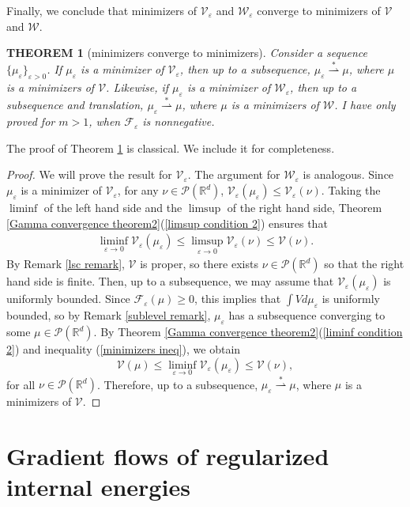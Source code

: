 \documentclass[11pt,leqno]{amsart}
\newtheorem{thm}{THEOREM}[section]
\theoremstyle{definition}
\newcommand{\Rd}{{\mathord{\mathbb R}^d}}
\newcommand{\wsto}{\stackrel{*}{\rightharpoonup}}
\newcommand{\F}{\mathcal{F}}
\def\P{{\mathcal P}}
\def\e{\varepsilon}
\def\F{\mathcal{F}}
\begin{document}
Finally, we conclude that minimizers of $\mathcal{V}_\e$ and $\mathcal{W}_\e$ converge to minimizers of $\mathcal{V}$ and $\mathcal{W}$.

\begin{thm}[minimizers converge to minimizers] \label{minimizers converge theorem}
Consider a sequence $\{ \mu_\e\}_{\e >0}$. If $ \mu_\e$ is a minimizer of $\mathcal{V}_\e$, then up to a subsequence, $\mu_\e \wsto \mu$, where $\mu$ is a minimizers of $\mathcal{V}$. Likewise, if $\mu_\e$ is a minimizer of $\mathcal{W}_\e$, then up to a subsequence and translation, $\mu_\e \wsto \mu$, where $\mu$ is a minimizers of $\mathcal{W}$. {\color{Aquamarine}  {I have only proved for $m>1$, when $\F_\e$ is nonnegative.}}
\end{thm}
 
 The proof of Theorem \ref{minimizers converge theorem} is classical. We include it for completeness.

\begin{proof}
We will prove the result for $\mathcal{V}_\e$. The argument for $\mathcal{W}_\e$ is analogous. Since $\mu_\e$ is a minimizer of $\mathcal{V}_\e$, for any $\nu \in \P(\Rd)$, $\mathcal{V}_\e(\mu_\e) \leq \mathcal{V}_\e(\nu)$. Taking the $\liminf$ of the left hand side and the $\limsup$ of the right hand side, Theorem \ref{Gamma convergence theorem2}(\ref{limsup condition 2}) ensures that 
\begin{align} \label{minimizers ineq}
 \liminf_{\e \to 0} \mathcal{V}_\e(\mu_\e) \leq \limsup_{\e \to 0} \mathcal{V}_\e(\nu) \leq \mathcal{V}(\nu) . 
 \end{align}
By Remark \ref{lsc remark}, $\mathcal{V}$ is proper, so there exists $\nu \in \P(\Rd)$ so that the right hand side is finite. Then, up to a subsequence, we may assume that $ \mathcal{V}_\e(\mu_\e)$ is uniformly bounded. Since $\F_\e(\mu) \geq 0$, this implies that $\int V d \mu_\e$ is uniformly bounded, so by Remark \ref{sublevel remark}, $\mu_\e$ has a subsequence converging to some $\mu \in \P(\Rd)$. By Theorem \ref{Gamma convergence theorem2}(\ref{liminf condition 2}) and inequality (\ref{minimizers ineq}), we obtain
\[ \mathcal{V}(\mu) \leq  \liminf_{\e \to 0} \mathcal{V}_\e(\mu_\e) \leq \mathcal{V}(\nu) ,
\]
for all $\nu \in \P(\Rd)$. Therefore, up to a subsequence, $\mu_\e \wsto \mu$, where $\mu$ is a minimizers of $\mathcal{V}$.
\end{proof}


\section{Gradient flows of regularized internal energies}
\end{document}
